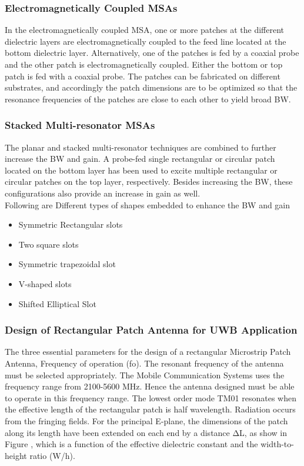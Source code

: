   \subsubsection{Electromagnetically Coupled MSAs}
    \justify
      In the electromagnetically coupled MSA, one or more patches at the different dielectric layers are electromagnetically coupled to the feed line located at the bottom dielectric layer.
      Alternatively, one of the patches is fed by a coaxial probe and the other patch is electromagnetically coupled. Either the bottom or top patch is fed with a coaxial probe. The patches can be fabricated on different substrates, and accordingly the patch dimensions are to be optimized so that the resonance frequencies of the patches are close to each other to yield broad BW.
    \subsubsection{ Stacked Multi-resonator MSAs}
      \justify
        The planar and stacked multi-resonator techniques are combined to further increase the BW and gain. A probe-fed single rectangular or circular patch located on the bottom layer has been used to excite multiple rectangular or circular patches on the top layer, respectively. Besides increasing the BW, these configurations also provide an increase in gain as well. \\


          	Following are Different types of shapes embedded to enhance the BW and gain

        \begin{itemize}

        	\item Symmetric Rectangular slots
        	\item Two square slots
        	\item Symmetric trapezoidal slot
        	\item V-shaped slots
        	\item Shifted Elliptical Slot

        \end{itemize}
       \subsubsection{ Design of  Rectangular Patch Antenna for UWB Application}
        \justify
         The three essential parameters for the design of a rectangular Microstrip Patch Antenna, Frequency of operation (fo). The resonant frequency of the antenna must be selected appropriately. The Mobile Communication Systems uses the frequency range from 2100-5600 MHz. Hence the antenna designed must be able to operate in this frequency range. The lowest order mode TM01 resonates when the effective length of the rectangular patch is half wavelength. Radiation occurs from the fringing fields. For the principal E-plane, the dimensions of the patch along its length have been extended on each end by a distance ΔL, as show in Figure , which is a function of the effective dielectric constant and the width-to-height ratio (W/h).
	         
